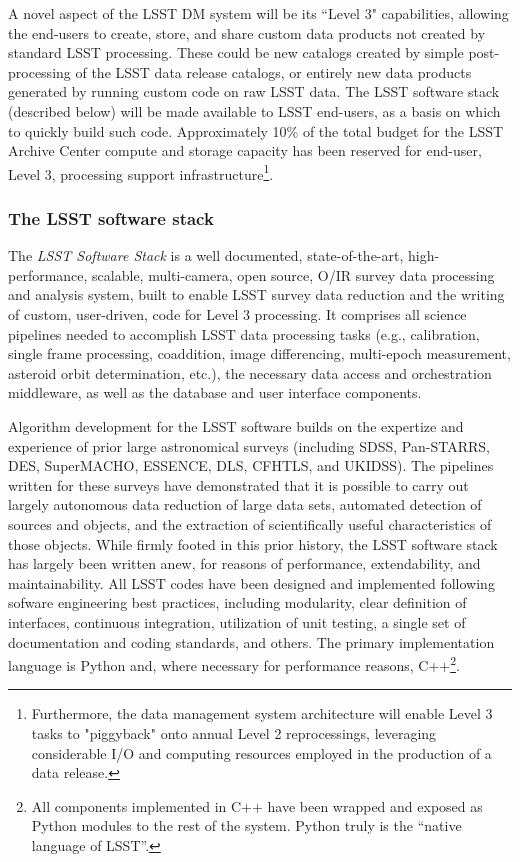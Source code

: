 \documentclass{emulateapj}
\begin{document}
A novel aspect of the LSST DM system will be its ``Level 3"
capabilities, allowing the end-users to create, store, and share
custom data products not created by standard LSST processing. These
could be new catalogs created by simple post-processing of the LSST
data release catalogs, or entirely new data products generated by
running custom code on raw LSST data. The LSST software stack (described
below) will be made available to LSST end-users, as a basis on which
to quickly build such code. Approximately 10\% of the total
budget for the LSST Archive Center compute and storage capacity has
been reserved for end-user, Level 3, processing support
infrastructure\footnote{Furthermore, the data management system 
architecture will enable Level 3 tasks to "piggyback" onto annual 
Level 2 reprocessings, leveraging considerable I/O and
computing resources employed in the production of a data release.}. 

\subsubsection{The LSST software stack}
\label{sec:dmstack}

The {\em LSST Software Stack} is a well documented, state-of-the-art,
high-performance, scalable, multi-camera, open source, O/IR survey
data processing and analysis system, built to enable LSST survey data
reduction and the writing of custom, user-driven, code for Level 3
processing. It comprises 
all science pipelines needed to accomplish LSST data processing tasks
(e.g., calibration, single frame processing, coaddition, image
differencing, multi-epoch measurement, asteroid orbit determination,
etc.), the necessary data 
access and orchestration middleware, as well as the database and user
interface components. 

Algorithm development for the LSST software builds on the expertize
and experience of prior large astronomical surveys (including SDSS,
Pan-STARRS, DES,  
SuperMACHO, ESSENCE,  DLS, CFHTLS, and UKIDSS). The pipelines written 
for these surveys have demonstrated that it is possible to carry out
largely autonomous data 
reduction of large data sets, automated detection of sources and
objects, and the  
extraction of scientifically useful characteristics of those objects. 
While firmly footed in this prior history, the LSST software stack has 
largely been written anew, for reasons of performance, extendability, and
maintainability. All LSST codes have been designed and implemented 
following sofware engineering best practices, including modularity, clear definition
of interfaces, continuous integration, 
utilization of unit testing, a single set of documentation and coding
standards, and others. The primary implementation language is Python and, where
necessary for performance reasons, C++\footnote{All components implemented 
in C++ have been wrapped and exposed as Python modules to the rest of the system. Python truly is the ``native language of LSST''.}.
\end{document}
